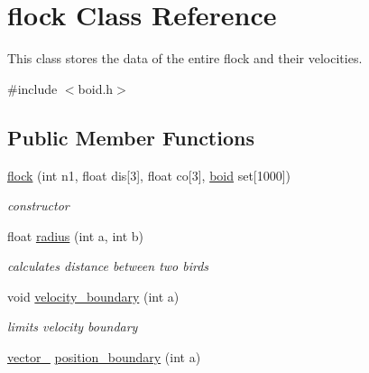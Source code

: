 \hypertarget{classflock}{}\section{flock Class Reference}
\label{classflock}


This class stores the data of the entire flock and their velocities.  




{\ttfamily \#include $<$boid.\+h$>$}

\subsection*{Public Member Functions}
\begin{DoxyCompactItemize}
\item 
\mbox{\label{classflock_a61593eacf077094a82752e2f199011ab}} 
\mbox{\hyperlink{classflock_a61593eacf077094a82752e2f199011ab}{flock}} (int n1, float dis\mbox{[}3\mbox{]}, float co\mbox{[}3\mbox{]}, \mbox{\hyperlink{classboid}{boid}} set\mbox{[}1000\mbox{]})
\begin{DoxyCompactList}\small\item\em constructor \end{DoxyCompactList}\item 
\mbox{\label{classflock_a11714695c03d9639b5dbe71f563b04ea}} 
float \mbox{\hyperlink{classflock_a11714695c03d9639b5dbe71f563b04ea}{radius}} (int a, int b)
\begin{DoxyCompactList}\small\item\em calculates distance between two birds \end{DoxyCompactList}\item 
\mbox{\label{classflock_ad8091787fa9dc3a5bb8fdbadc5992306}} 
void \mbox{\hyperlink{classflock_ad8091787fa9dc3a5bb8fdbadc5992306}{velocity\+\_\+boundary}} (int a)
\begin{DoxyCompactList}\small\item\em limits velocity boundary \end{DoxyCompactList}\item 
\mbox{\label{classflock_ad29b3fa757bf0aae67d34395e78dcd14}} 
\mbox{\hyperlink{classvector__3}{vector\+\_}} \mbox{\hyperlink{classflock_ad29b3fa757bf0aae67d34395e78dcd14}{position\+\_\+boundary}} (int a)

\end{DoxyCompactItemize}
